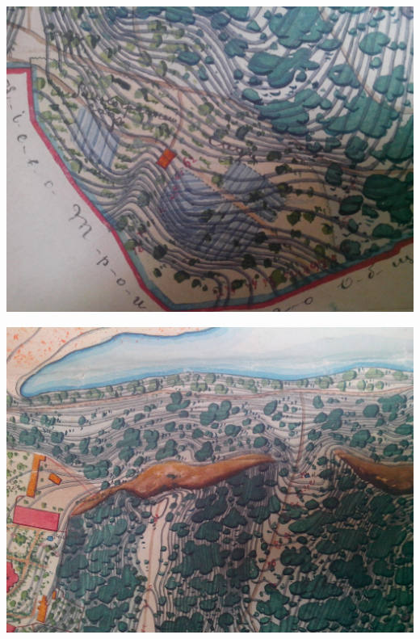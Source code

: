 \begin{center}
\includegraphics[width=\linewidth]{chast-vosp/zver/IMG_20170627_153959.jpg}
\end{center}

\begin{center}
\includegraphics[width=\linewidth]{chast-vosp/zver/IMG_20170627_154014.jpg}
\end{center}

